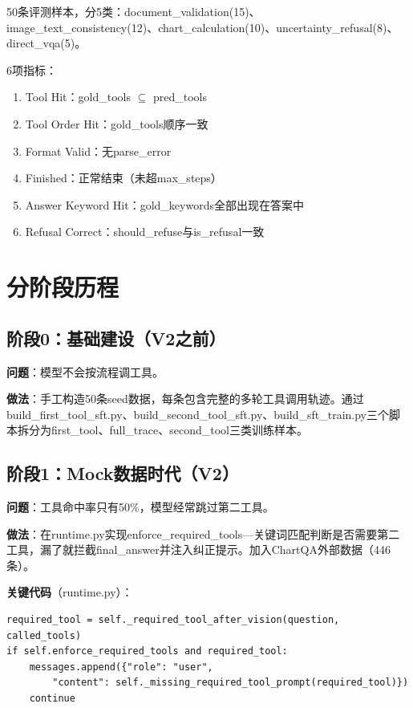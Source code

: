 \documentclass[fontset=none,11pt,a4paper]{ctexart}
\begin{document}
50条评测样本，分5类：document\_validation(15)、image\_text\_consistency(12)、chart\_calculation(10)、uncertainty\_refusal(8)、direct\_vqa(5)。

6项指标：
\begin{enumerate}[nosep]
    \item Tool Hit：gold\_tools $\subseteq$ pred\_tools
    \item Tool Order Hit：gold\_tools顺序一致
    \item Format Valid：无parse\_error
    \item Finished：正常结束（未超max\_steps）
    \item Answer Keyword Hit：gold\_keywords全部出现在答案中
    \item Refusal Correct：should\_refuse与is\_refusal一致
\end{enumerate}

\section{分阶段历程}

\subsection{阶段0：基础建设（V2之前）}

\textbf{问题}：模型不会按流程调工具。

\textbf{做法}：手工构造50条seed数据，每条包含完整的多轮工具调用轨迹。通过build\_first\_tool\_sft.py、build\_second\_tool\_sft.py、build\_sft\_train.py三个脚本拆分为first\_tool、full\_trace、second\_tool三类训练样本。

\subsection{阶段1：Mock数据时代（V2）}

\textbf{问题}：工具命中率只有50\%，模型经常跳过第二工具。

\textbf{做法}：在runtime.py实现enforce\_required\_tools---关键词匹配判断是否需要第二工具，漏了就拦截final\_answer并注入纠正提示。加入ChartQA外部数据（446条）。

\textbf{关键代码}（runtime.py）：
\begin{verbatim}
required_tool = self._required_tool_after_vision(question, called_tools)
if self.enforce_required_tools and required_tool:
    messages.append({"role": "user",
        "content": self._missing_required_tool_prompt(required_tool)})
    continue
\end{verbatim}
\end{document}
